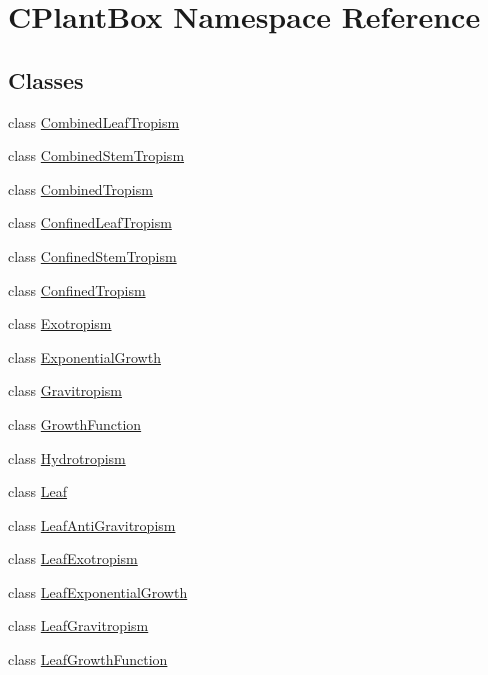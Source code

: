\hypertarget{namespaceCPlantBox}{}\section{C\+Plant\+Box Namespace Reference}
\label{namespaceCPlantBox}
\subsection*{Classes}
\begin{DoxyCompactItemize}
\item 
class \hyperlink{classCPlantBox_1_1CombinedLeafTropism}{Combined\+Leaf\+Tropism}
\item 
class \hyperlink{classCPlantBox_1_1CombinedStemTropism}{Combined\+Stem\+Tropism}
\item 
class \hyperlink{classCPlantBox_1_1CombinedTropism}{Combined\+Tropism}
\item 
class \hyperlink{classCPlantBox_1_1ConfinedLeafTropism}{Confined\+Leaf\+Tropism}
\item 
class \hyperlink{classCPlantBox_1_1ConfinedStemTropism}{Confined\+Stem\+Tropism}
\item 
class \hyperlink{classCPlantBox_1_1ConfinedTropism}{Confined\+Tropism}
\item 
class \hyperlink{classCPlantBox_1_1Exotropism}{Exotropism}
\item 
class \hyperlink{classCPlantBox_1_1ExponentialGrowth}{Exponential\+Growth}
\item 
class \hyperlink{classCPlantBox_1_1Gravitropism}{Gravitropism}
\item 
class \hyperlink{classCPlantBox_1_1GrowthFunction}{Growth\+Function}
\item 
class \hyperlink{classCPlantBox_1_1Hydrotropism}{Hydrotropism}
\item 
class \hyperlink{classCPlantBox_1_1Leaf}{Leaf}
\item 
class \hyperlink{classCPlantBox_1_1LeafAntiGravitropism}{Leaf\+Anti\+Gravitropism}
\item 
class \hyperlink{classCPlantBox_1_1LeafExotropism}{Leaf\+Exotropism}
\item 
class \hyperlink{classCPlantBox_1_1LeafExponentialGrowth}{Leaf\+Exponential\+Growth}
\item 
class \hyperlink{classCPlantBox_1_1LeafGravitropism}{Leaf\+Gravitropism}
\item 
class \hyperlink{classCPlantBox_1_1LeafGrowthFunction}{Leaf\+Growth\+Function}
\item 

\end{DoxyCompactItemize}
